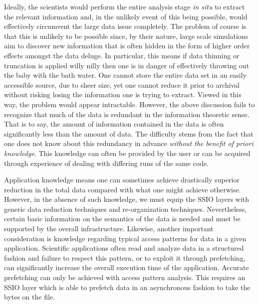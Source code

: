 Ideally, the scientists would perform the entire analysis stage {\em in situ} to
extract the relevant information and, in the unlikely event of this being
possible, would effectively circumvent the large data issue completely.  The
problem of course is that this is unlikely to be possible since, by their
nature, large scale simulations aim to discover new information that is often
hidden in the form of higher order effects amongst the data deluge. In
particular, this means if data thinning or truncation is applied willy nilly
then one is in danger of effectively throwing out the baby with the bath water.
One cannot store the entire data set in an easily accessible source, due to
sheer size, yet one cannot reduce it prior to archival without risking losing
the information one is trying to extract.  Viewed in this way, the problem
would appear intractable. However, the above discussion fails to recognize that
much of the data is redundant in the information theoretic sense.  That is to
say, the amount of information contained in the data is often significantly
less than the amount of data.  The difficulty stems from the fact that one does
not know about this redundancy in advance \emph{without the benefit of 
priori knowledge}. This knowledge can often be provided by the user or can 
be acquired through experience of dealing with differing runs of the same
code. 

Application knowledge means one can sometimes achieve drastically superior
reduction in the total data compared with what one might achieve otherwise.
However, in the absence of such knowledge, we must equip the SSIO layers with
generic data reduction techniques and re-organization techniques.
Nevertheless, certain basic information on the semantics of the data is needed
and must be supported by the overall infrastructure.  Likewise, another
important consideration is knowledge regarding typical access patterns for data
in a given application. Scientific applications often read and analyze data in
a structured fashion and failure to respect this pattern, or to exploit it
through prefetching, can significantly increase the overall execution time of
the application. Accurate prefetching can only be achieved with access pattern
analysis. This requires an SSIO layer which is able to prefetch data in an
asynchronous fashion to take the bytes on the file.

